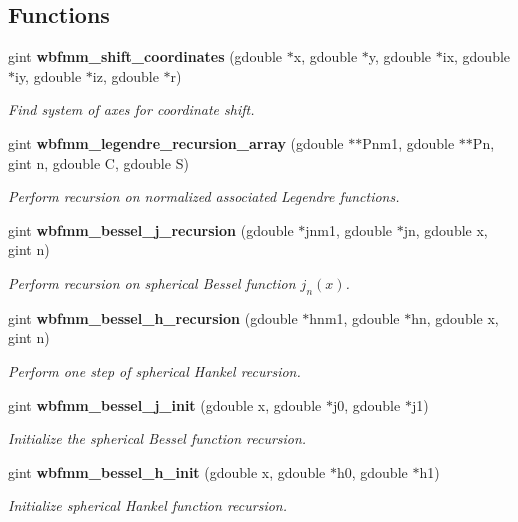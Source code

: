 \subsection*{Functions}
\begin{DoxyCompactItemize}
\item 
gint {\bf wbfmm\+\_\+shift\+\_\+coordinates} (gdouble $\ast$x, gdouble $\ast$y, gdouble $\ast$ix, gdouble $\ast$iy, gdouble $\ast$iz, gdouble $\ast$r)
\begin{DoxyCompactList}\small\item\em Find system of axes for coordinate shift. \end{DoxyCompactList}\item 
gint {\bf wbfmm\+\_\+legendre\+\_\+recursion\+\_\+array} (gdouble $\ast$$\ast$Pnm1, gdouble $\ast$$\ast$Pn, gint n, gdouble C, gdouble S)
\begin{DoxyCompactList}\small\item\em Perform recursion on normalized associated Legendre functions. \end{DoxyCompactList}\item 
gint {\bf wbfmm\+\_\+bessel\+\_\+j\+\_\+recursion} (gdouble $\ast$jnm1, gdouble $\ast$jn, gdouble x, gint n)
\begin{DoxyCompactList}\small\item\em Perform recursion on spherical Bessel function $j_{n}(x)$. \end{DoxyCompactList}\item 
gint {\bf wbfmm\+\_\+bessel\+\_\+h\+\_\+recursion} (gdouble $\ast$hnm1, gdouble $\ast$hn, gdouble x, gint n)
\begin{DoxyCompactList}\small\item\em Perform one step of spherical Hankel recursion. \end{DoxyCompactList}\item 
gint {\bf wbfmm\+\_\+bessel\+\_\+j\+\_\+init} (gdouble x, gdouble $\ast$j0, gdouble $\ast$j1)
\begin{DoxyCompactList}\small\item\em Initialize the spherical Bessel function recursion. \end{DoxyCompactList}\item 
gint {\bf wbfmm\+\_\+bessel\+\_\+h\+\_\+init} (gdouble x, gdouble $\ast$h0, gdouble $\ast$h1)
\begin{DoxyCompactList}\small\item\em Initialize spherical Hankel function recursion. \end{DoxyCompactList}\item 

\end{DoxyCompactItemize}
